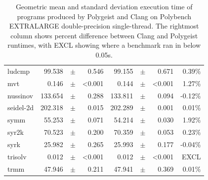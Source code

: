 \documentclass[sigplan]{acmart}
\newcommand{\tool}{Polygeist\xspace}
\begin{document}
\begin{table}
{\begin{center}
\begin{tabular}{lrp{0.08cm}rrp{0.08cm}rr}
ludcmp&	99.538&$\pm$&	0.546&	99.155&$\pm$&	0.671& 0.39\%\\\rowcolor{aluminium1}
mvt&	0.146&$\pm$&	<0.001&	0.144&$\pm$&	<0.001& 1.27\%\\
nussinov&	133.654&$\pm$&	0.288&	133.811&$\pm$&	0.094& -0.12\%\\\rowcolor{aluminium1}
seidel-2d&	202.318&$\pm$&	0.015&	202.289&$\pm$&	0.001& 0.01\%\\
symm&	55.253&$\pm$&	0.071&	54.214&$\pm$&	0.030& 1.92\%\\\rowcolor{aluminium1}
syr2k&	70.523&$\pm$&	0.200&	70.359&$\pm$&	0.053& 0.23\%\\
syrk&	25.982&$\pm$&	0.265&	25.993&$\pm$&	0.177& -0.04\%\\\rowcolor{aluminium1}
trisolv&	0.012&$\pm$&	<0.001&	0.012&$\pm$&	<0.001& EXCL\\
trmm&	47.946&$\pm$&	0.211&	47.941&$\pm$&	0.369& 0.01\%\\ \bottomrule
\end{tabular}
\end{center}
}
\caption{Geometric mean and standard deviation execution time of programs produced by \tool and Clang on Polybench EXTRALARGE double-precision single-thread. The rightmost column shows percent difference between Clang and \tool runtimes, with EXCL showing where a benchmark ran in below 0.05s.}
\label{table::clang_and_our_tool}
\end{table}
\end{document}
